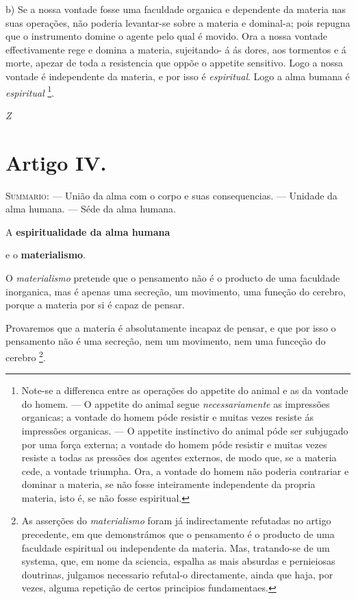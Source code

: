 b) Se a nossa vontade fosse uma faculdade organica e dependente da materia nas suas operações, não poderia levantar-se sobre a materia e dominal-a; pois repugna que o instrumento domine o agente pelo qual é movido. Ora a nossa vontade effectivamente rege e domina a materia, sujeitando- á ás dores, aos tormentos e á morte, apezar de toda a resistencia que oppõe o appetite sensitivo. Logo a nossa vontade é independente da materia, e por isso é \emph{espiritual}. Logo a alma bumana é \emph{espiritual} \footnote{Note-se a differenca entre as operações do appetite do animal e as da vontade do homem. --- O appetite do animal segue \emph{necessariamente} as impressões organicas; a vontade do homem póde resistir e muitas vezes resiste ás impressões organicas. --- O appetite instinctivo do animal póde ser subjugado por uma força externa; a vontade do homem póde resistir e muitas vezes resiste a todas as pressões dos agentes externos, de modo que, se a materia cede, a vontade triumpha. Ora, a vontade do homem não poderia contrariar e dominar a materia, se não fosse inteiramente independente da propria materia, isto é, se não fosse espiritual.}.

\emph{Z}


\section*{Artigo IV.}

{\small\noindent\textsc{Summario}: --- União da alma com o corpo e suas consequencias. --- Unidade da alma humana. --- Séde da alma humana.\par}

 A \textbf{espiritualidade da alma humana}

e o \textbf{materialismo}.


O \emph{materialismo} pretende que o pensamento não é o producto de uma faculdade inorganica, mas é apenas uma secreção, um movimento, uma funeção do cerebro, porque a materia por si é capaz de pensar.

Provaremos que a materia é absolutamente incapaz de pensar, e que por isso o pensamento não é uma secreção, nem um movimento, nem uma funceção do cerebro \footnote{As asserções do \emph{materialismo} foram já indirectamente refutadas no artigo precedente, em que demonstrámos que o pensamento é o producto de uma faculdade espiritual ou independente da materia. Mas, tratando-se de um systema, que, em nome da sciencia, espalha as mais absurdas e pernieiosas doutrinas, julgamos necessario refutal-o directamente, ainda que haja, por vezes, alguma repetição de certos principios fundamentaes.}.

